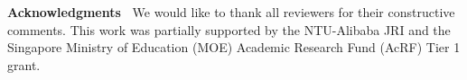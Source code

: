 \documentclass[10pt,twocolumn,letterpaper]{article}
\begin{document}
\noindent\textbf{Acknowledgments~}
We would like to thank all reviewers for their constructive comments. This work was partially supported by the NTU-Alibaba JRI and the Singapore Ministry of Education (MOE) Academic Research Fund (AcRF) Tier 1 grant. 

{\small


}

\clearpage










\end{document}
